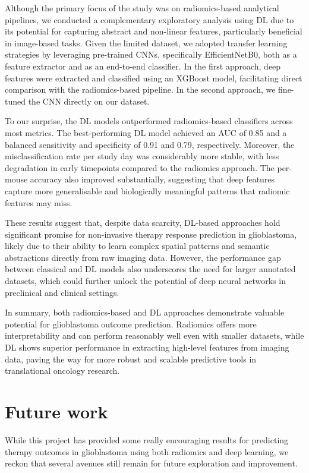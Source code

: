 \documentclass[12pt, a4paper]{report}
\begin{document}
Although the primary focus of the study was on radiomics-based analytical pipelines, we conducted a complementary exploratory analysis using DL due to its potential for capturing abstract and non-linear features, particularly beneficial in image-based tasks. Given the limited dataset, we adopted transfer learning strategies by leveraging pre-trained CNNs, specifically EfficientNetB0, both as a feature extractor and as an end-to-end classifier. In the first approach, deep features were extracted and classified using an XGBoost model, facilitating direct comparison with the radiomics-based pipeline. In the second approach, we fine-tuned the CNN directly on our dataset.

To our surprise, the DL models outperformed radiomics-based classifiers across most metrics. The best-performing DL model achieved an AUC of 0.85 and a balanced sensitivity and specificity of 0.91 and 0.79, respectively. Moreover, the misclassification rate per study day was considerably more stable, with less degradation in early timepoints compared to the radiomics approach. The per-mouse accuracy also improved substantially, suggesting that deep features capture more generalisable and biologically meaningful patterns that radiomic features may miss.

These results suggest that, despite data scarcity, DL-based approaches hold significant promise for non-invasive therapy response prediction in glioblastoma, likely due to their ability to learn complex spatial patterns and semantic abstractions directly from raw imaging data. However, the performance gap between classical and DL models also underscores the need for larger annotated datasets, which could further unlock the potential of deep neural networks in preclinical and clinical settings.

In summary, both radiomics-based and DL approaches demonstrate valuable potential for glioblastoma outcome prediction. Radiomics offers more interpretability and can perform reasonably well even with smaller datasets, while DL shows superior performance in extracting high-level features from imaging data, paving the way for more robust and scalable predictive tools in translational oncology research.

\section{Future work}

While this project has provided some really encouraging results for predicting therapy outcomes in glioblastoma using both radiomics and deep learning, we reckon that several avenues still remain for future exploration and improvement.
\end{document}

